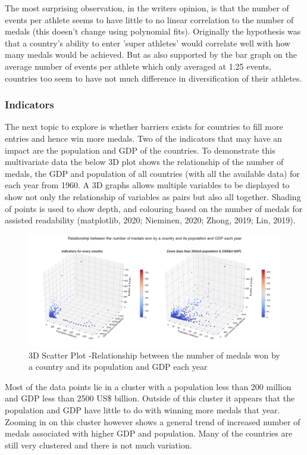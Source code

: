 \documentclass[a4 paper, 12pt]{article}
\begin{document}
        The most surprising observation, in the writers opinion, is that the number of events per athlete seems to have little to no linear correlation to the number of medals (this doesn't change using polynomial fits). Originally the hypothesis was that a country's ability to enter 'super athletes' would correlate well with how many medals would be achieved. But as also supported by the bar graph on the average number of events per athlete which only averaged at 1.25 events, countries too seem to have not much difference in diversification of their athletes.

        \subsubsection{Indicators}
        The next topic to explore is whether barriers exists for countries to fill more entries and hence win more medals. Two of the indicators that may have an impact are the population and GDP of the countries. To demonstrate this multivariate data the below 3D plot shows the relationship of the number of medals, the GDP and population of all countries (with all the available data) for each year from 1960. A 3D graphs allows multiple variables to be displayed to show not only the relationship of variables as pairs but also all together. Shading of points is used to show depth, and colouring based on the number of medals for assisted readability (matplotlib, 2020; Nieminen, 2020; Zhong, 2019; Lin, 2019).
        \begin{figure} [H]
            \centering
            \includegraphics[width=\textwidth, frame]
                {./images/graph/countries_pop_gdp_3d.png}      
                \caption{3D Scatter Plot -Relationship between the number of medals won by a country and its population and GDP each year} 
        \end{figure}

        Most of the data points lie in a cluster with a population less than 200 million and GDP less than 2500 US\$ billion. Outside of this cluster it appears that the population and GDP have little to do with winning more medals that year. Zooming in on this cluster however shows a general trend of increased number of medals associated with higher GDP and population. Many of the countries are still very clustered and there is not much variation. 
\end{document}
